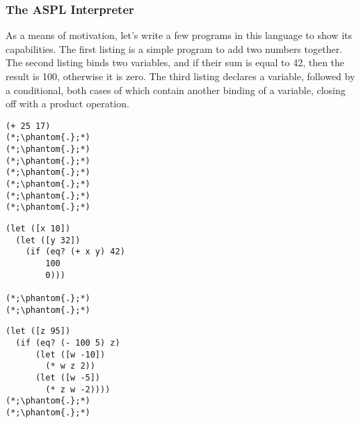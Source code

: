 \subsubsection*{The ASPL Interpreter}

As a means of motivation, let's write a few programs in this language to show its capabilities. The first listing is a simple program to add two numbers together. The second listing binds two variables, and if their sum is equal to 42, then the result is 100, otherwise it is zero. The third listing declares a variable, followed by a conditional, both cases of which contain another binding of a variable, closing off with a product operation.

\noindent %
\begin{minipage}[t]{0.32\textwidth}
\begin{lstlisting}[language=MyScheme, frame=single]
(+ 25 17)
(*;\phantom{.};*)
(*;\phantom{.};*)
(*;\phantom{.};*)
(*;\phantom{.};*)
(*;\phantom{.};*)
(*;\phantom{.};*)
(*;\phantom{.};*)
\end{lstlisting}
\end{minipage}%
\hfill %
\begin{minipage}[t]{0.32\textwidth}
\begin{lstlisting}[language=MyScheme, frame=single]
(let ([x 10])
  (let ([y 32])
    (if (eq? (+ x y) 42)
        100
        0)))

(*;\phantom{.};*)
(*;\phantom{.};*)
\end{lstlisting}
\end{minipage}%
\hfill %
\begin{minipage}[t]{0.32\textwidth}
\begin{lstlisting}[language=MyScheme, frame=single]
(let ([z 95])
  (if (eq? (- 100 5) z)
      (let ([w -10])
        (* w z 2))
      (let ([w -5])
        (* z w -2))))
(*;\phantom{.};*)
(*;\phantom{.};*)
\end{lstlisting}
\end{minipage}

